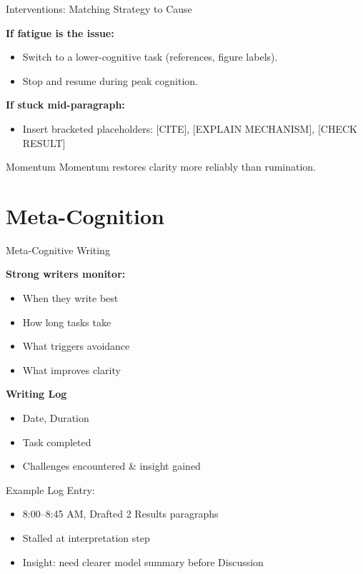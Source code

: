 \documentclass{beamer}
\begin{document}
\begin{frame}{Interventions: Matching Strategy to Cause}


\textbf{If fatigue is the issue:}
\begin{itemize}
    \item Switch to a lower-cognitive task (references, figure labels).
    \item Stop and resume during peak cognition.
\end{itemize}

\textbf{If stuck mid-paragraph:}
\begin{itemize}
    \item Insert bracketed placeholders:
    [CITE], [EXPLAIN MECHANISM], [CHECK RESULT]
\end{itemize}

\vspace{0.5em}
\begin{block}{Momentum}
    Momentum restores clarity more reliably than rumination.
\end{block}


\end{frame}


\section{Meta-Cognition}

\begin{frame}{Meta-Cognitive Writing}

\textbf{Strong writers monitor:}
\begin{itemize}
    \item When they write best
    \item How long tasks take
    \item What triggers avoidance
    \item What improves clarity
\end{itemize}

\textbf{Writing Log}
\begin{itemize}
    \item Date, Duration
    \item Task completed
    \item Challenges encountered \& insight gained
\end{itemize}

\vspace{1em}
\scriptsize
Example Log Entry:
\begin{itemize}
    \item 8:00--8:45 AM, Drafted 2 Results paragraphs
    \item Stalled at interpretation step
    \item Insight: need clearer model summary before Discussion
\end{itemize}

\end{frame}
\end{document}
